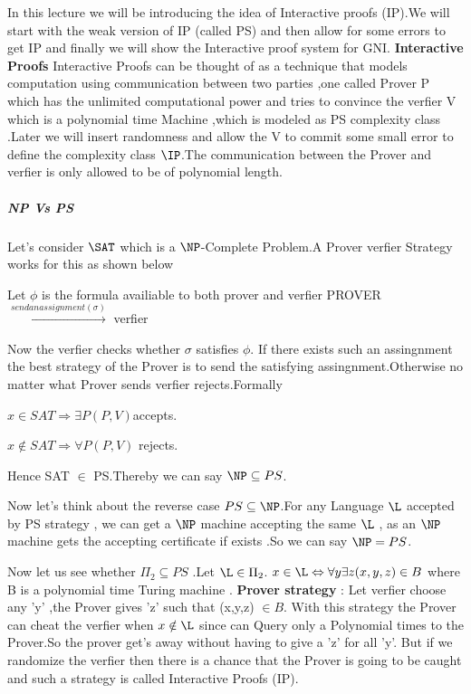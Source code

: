 In this lecture we will be introducing the idea of Interactive proofs (IP).We will start with the weak version of IP (called PS) and then allow for some errors to get IP and finally we will show the Interactive proof system for GNI.
\newline \textbf {Interactive Proofs}
	\newline Interactive Proofs can be thought of  as a technique that models computation using communication between two parties ,one called Prover P which has the unlimited computational power  and tries to convince the verfier V which is a polynomial time Machine ,which is modeled as PS complexity class .Later we will insert randomness and allow  the V to commit some small error to define the complexity class $\IP$.The communication between the Prover and verfier is only allowed to be of polynomial length.
\subparagraph{\textbf {NP Vs PS}\newline}Let's consider $\SAT$ which is a $\NP$-Complete Problem.A Prover verfier Strategy works for this as shown below

          Let $\phi$ is the formula availiable to both prover and verfier 
          \newline PROVER  $ \xrightarrow{send an assignment (\sigma )} $  verfier

          Now the verfier checks whether $\sigma$ satisfies $\phi$. If there exists such an assingnment the best strategy of the Prover is to send the satisfying assingnment.Otherwise no matter what Prover sends verfier rejects.Formally

 $ x \in SAT  \Rightarrow \exists P (P,V) $accepts.

 $x \notin SAT \Rightarrow \forall P (P,V)$ rejects.

 Hence SAT $\in $ PS.Thereby we can say $\NP\subseteq PS$.

          Now let's think about the reverse case $ PS \subseteq \NP$.For any Language $\L$ accepted by PS strategy , we can get a $\NP$ machine accepting the same $\L$ , as an $\NP$ machine gets the accepting certificate if exists .So we can say  $\NP= PS$.

Now let us see whether $\Pi_{2}\subseteq PS $ .Let $\L \in \Pi_{2} $.
\newline $ x \in \L  \Leftrightarrow  \forall y \exists z (x,y,z)\in B $ where B is a polynomial time Turing machine .
\newline \textbf{Prover strategy} : Let verfier choose any 'y' ,the Prover gives 'z' such that (x,y,z) $\in B $.
\newline With this strategy the Prover can cheat the verfier  when $ x \notin \L$  since  can Query only a Polynomial times to the Prover.So the prover get's away without having to give a 'z' for all 'y'.
But if we randomize the verfier then there is a chance that the Prover is going to be caught and such a strategy is called 
Interactive Proofs (IP).


